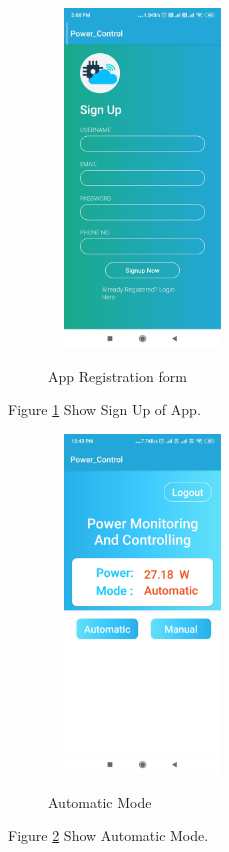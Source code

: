 \documentclass[12pt,a4paper]{article}
\begin{document}
\begin{figure}[H]
	\centering
	\includegraphics[width=5cm, height=9cm]{appi3.jpg}\\
	\caption{App Registration form}
	\label{fig:6.2.2}
\end{figure}
\begin{center}
Figure \ref{fig:6.2.2} Show Sign Up of App.
\end{center}

\begin{figure}[H]
	\centering
	\includegraphics[width=5cm, height=9cm]{appi6.jpg}\\
	\caption{Automatic Mode }
	\label{fig:6.2.3}
\end{figure}
\begin{center}
Figure \ref{fig:6.2.3} Show Automatic Mode.
\end{center}
\end{document}
